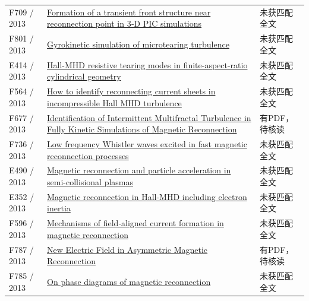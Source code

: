 \begin{longtable}{P{24mm}P{97mm}P{27mm}}
F709 / 2013 & \href{https://doi.org/10.1002/jgra.50136}{Formation of a transient front structure near reconnection point in 3‐D PIC simulations} & 未获匹配全文\\

F801 / 2013 & \href{https://doi.org/10.18725/oparu-2600}{Gyrokinetic simulation of microtearing turbulence} & 未获匹配全文\\

E414 / 2013 & \href{http://absimage.aps.org/image/DPP13/MWS_DPP13-2013-001107.pdf}{Hall-MHD resistive tearing modes in finite-aspect-ratio cylindrical geometry} & 未获匹配全文\\

F564 / 2013 & \href{https://doi.org/10.1002/jgra.50442}{How to identify reconnecting current sheets in incompressible Hall MHD turbulence} & 未获匹配全文\\

F677 / 2013 & \href{https://doi.org/10.1103/physrevlett.110.205002}{Identification of Intermittent Multifractal Turbulence in Fully Kinetic Simulations of Magnetic Reconnection} & 有PDF，待核读\\

F736 / 2013 & \href{https://doi.org/10.1007/s11467-013-0369-x}{Low frequency Whistler waves excited in fast magnetic reconnection processes} & 未获匹配全文\\

E490 / 2013 & \href{https://research.manchester.ac.uk/en/studentTheses/26c3b17d-87ca-4d98-b5b5-3a3d78e0dd03}{Magnetic reconnection and particle acceleration in semi-collisional plasmas} & 未获匹配全文\\

E352 / 2013 & \href{https://ui.adsabs.harvard.edu/abs/2013AGUFMSH51B2092G/abstract}{Magnetic reconnection in Hall-MHD including electron inertia} & 未获匹配全文\\

F596 / 2013 & \href{https://doi.org/10.1002/jgra.50457}{Mechanisms of field‐aligned current formation in magnetic reconnection} & 未获匹配全文\\

F787 / 2013 & \href{https://doi.org/10.1103/physrevlett.111.135001}{New Electric Field in Asymmetric Magnetic Reconnection} & 有PDF，待核读\\

F785 / 2013 & \href{https://doi.org/10.1063/1.4811120}{On phase diagrams of magnetic reconnection} & 未获匹配全文\\


\end{longtable}
